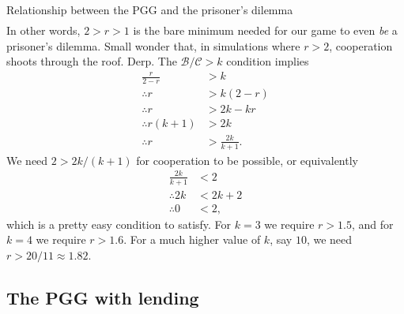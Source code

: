 \documentclass[13pt]{amsart}
\begin{document}
\begin{section}{Relationship between the PGG and the prisoner's dilemma}
\begin{equation}
\begin{split}
    \end{split}
\end{equation}
In other words, $2 > r > 1$ is the bare minimum needed for our game to even \emph{be} a prisoner's dilemma.
Small wonder that, in simulations where $r > 2$, cooperation shoots through the roof.
Derp.
The $\mathcal{B}/\mathcal{C} > k$ condition implies
\begin{equation}
    \begin{split}
        \frac{r}{2-r} & > k \\
        \therefore r & > k(2-r) \\
        \therefore r & > 2k - kr \\
        \therefore r(k+1) & > 2k \\
        \therefore r & > \frac{2k}{k+1}.
    \end{split}
\end{equation}
We need $2 > 2k/(k+1)$ for cooperation to be possible, or equivalently
\begin{equation}
    \begin{split}
        \frac{2k}{k+1} & < 2 \\
        \therefore 2k & < 2k + 2 \\
        \therefore 0 & < 2,
    \end{split}
\end{equation}
which is a pretty easy condition to satisfy.
For $k = 3$ we require $r > 1.5$, and for $k = 4$ we require $r > 1.6$.
For a much higher value of $k$, say $10$, we need $r > 20/11 \approx 1.82$.

\section{The PGG with lending}


\end{section}
\end{document}
